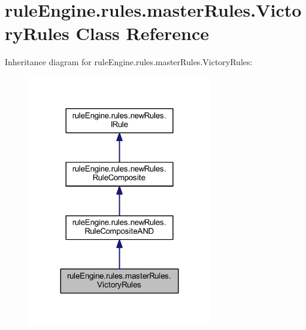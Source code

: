 \hypertarget{classrule_engine_1_1rules_1_1master_rules_1_1_victory_rules}{}\section{rule\+Engine.\+rules.\+master\+Rules.\+Victory\+Rules Class Reference}
\label{classrule_engine_1_1rules_1_1master_rules_1_1_victory_rules}


Inheritance diagram for rule\+Engine.\+rules.\+master\+Rules.\+Victory\+Rules\+:
\nopagebreak
\begin{figure}[H]
\begin{center}
\leavevmode
\includegraphics[width=227pt]{classrule_engine_1_1rules_1_1master_rules_1_1_victory_rules__inherit__graph}
\end{center}
\end{figure}


